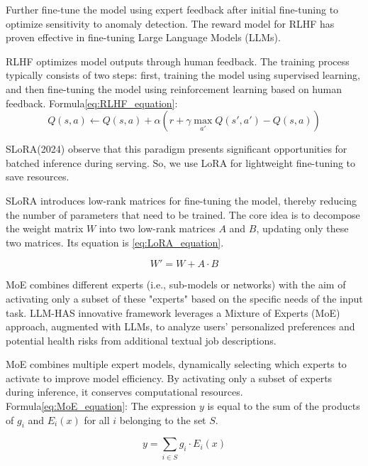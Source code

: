 \documentclass[usenatbib]{tjaa}
\begin{document}
Further fine-tune the model using expert feedback after initial fine-tuning to optimize sensitivity to anomaly detection.
The reward model for RLHF has proven effective in fine-tuning Large Language Models
(LLMs)\citep{zhang2024prototypical}.

RLHF optimizes model outputs through human feedback.
The training process typically consists of two steps:
first, training the model using supervised learning,
and then fine-tuning the model using reinforcement
learning based on human feedback. %
Formula\ref{eq:RLHF_equation}:
\begin{equation}
  Q(s, a) \gets Q(s, a) + \alpha \left( r + \gamma \max_{a'} Q(s', a') - Q(s, a) \right)
  \label{eq:RLHF_equation} %
\end{equation}

SLoRA(2024) observe that this paradigm presents significant opportunities
for batched inference during serving\citep{sheng2024slora}.
So, we use LoRA for lightweight fine-tuning to save resources.

SLoRA introduces low-rank matrices for fine-tuning the model,
thereby reducing the number of parameters that need to be trained.
The core idea is to decompose the weight matrix $W$ into two low-rank
matrices $A$ and $B$, updating only these two matrices.%
Its equation is \ref{eq:LoRA_equation}.

\begin{equation}
  W' = W + A \cdot B
  \label{eq:LoRA_equation} %
\end{equation}

MoE combines different experts (i.e., sub-models or networks)
with the aim of activating only a subset of these "experts" based
on the specific needs of the input task.
LLM-HAS innovative framework leverages a Mixture
of Experts (MoE) approach, augmented with LLMs, to analyze
users’ personalized preferences and potential health risks from
additional textual job descriptions\citep{gao2024guiding}.

MoE combines multiple expert models, dynamically selecting which experts
to activate to improve model efficiency. By activating only a subset of
experts during inference, it conserves computational resources. %
Formula\ref{eq:MoE_equation}:
The expression $y$ is equal to the sum of the products of $g_i$ and $E_i(x)$ for all $i$ belonging to the set $S$.

\begin{equation}
  y = \sum_{i \in S} g_i \cdot E_i(x)
  \label{eq:MoE_equation} %
\end{equation}
\end{document}

